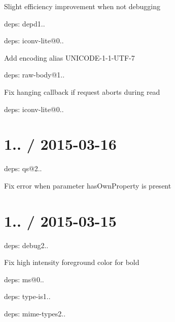 
\begin{DoxyItemize}
\item Slight efficiency improvement when not debugging
\item deps\+: depd1..
\item deps\+: iconv-\/lite@0..
\begin{DoxyItemize}
\item Add encoding alias U\+N\+I\+C\+O\+D\+E-\/1-\/1-\/\+U\+T\+F-\/7
\end{DoxyItemize}
\item deps\+: raw-\/body@1..
\begin{DoxyItemize}
\item Fix hanging callback if request aborts during read
\item deps\+: iconv-\/lite@0..
\end{DoxyItemize}
\end{DoxyItemize}

\section*{1.. / 2015-\/03-\/16 }


\begin{DoxyItemize}
\item deps\+: qs@2..
\begin{DoxyItemize}
\item Fix error when parameter {\ttfamily has\+Own\+Property} is present
\end{DoxyItemize}
\end{DoxyItemize}

\section*{1.. / 2015-\/03-\/15 }


\begin{DoxyItemize}
\item deps\+: debug2..
\begin{DoxyItemize}
\item Fix high intensity foreground color for bold
\item deps\+: ms@0..
\end{DoxyItemize}
\item deps\+: type-\/is1..
\begin{DoxyItemize}
\item deps\+: mime-\/types2..
\end{DoxyItemize}
\end{DoxyItemize}

